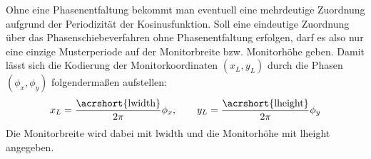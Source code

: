 Ohne eine Phasenentfaltung bekommt man eventuell eine mehrdeutige Zuordnung aufgrund der Periodizität der Kosinusfunktion.
Soll eine eindeutige Zuordnung über das Phasenschiebeverfahren ohne Phasenentfaltung erfolgen, darf es also nur eine einzige Musterperiode auf der Monitorbreite bzw. Monitorhöhe geben.
Damit lässt sich die Kodierung der Monitorkoordinaten $(x_{L}, y_{L})$ durch die Phasen $(\phi_{x}, \phi_{y})$ folgendermaßen aufstellen:
%
\begin{equation}\label{eq:phasenkodierung}
	x_{L} = \dfrac{\text{\acrshort{lwidth}}}{2\pi}\phi_{x},
	\qquad
	y_{L} = \dfrac{\text{\acrshort{lheight}}}{2\pi}\phi_{y}
\end{equation}
%
\noindent
Die Monitorbreite wird dabei mit \acrshort{lwidth} und die Monitorhöhe mit \acrshort{lheight} angegeben.

